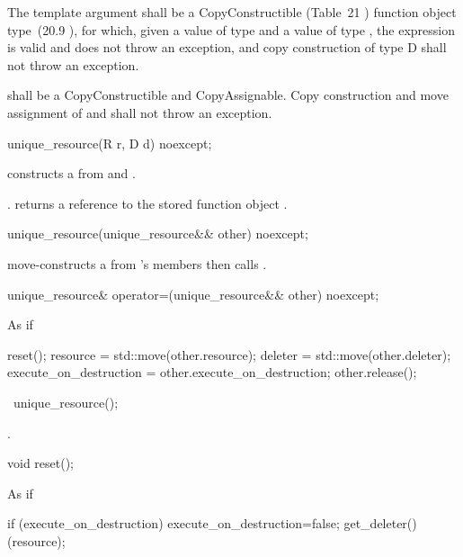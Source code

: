 \documentclass[ebook,11pt,article]{memoir}
\begin{document}
\pnum 
The template argument
 shall be a CopyConstructible (Table~21
) 
function object type~(20.9
), 
for which, given
a value  of type  and a value
 of type , the expression
 is valid and does not throw an exception,
and copy construction of type D shall not throw an exception.

\pnum
{} shall be a CopyConstructible and CopyAssignable.
Copy construction and move assignment of  and  shall not throw an exception.

\begin{itemdecl}
unique_resource(R r, D d) noexcept;
\end{itemdecl}

\begin{itemdescr}
\pnum
\effects constructs a  from  and .

\pnum
\postconditions {}.
 returns a reference to the stored
function object .
\end{itemdescr}

\begin{itemdecl}
unique_resource(unique_resource&& other) noexcept;
\end{itemdecl}

\pnum
\effects move-constructs a  from 's members then calls .

\begin{itemdecl}
unique_resource& operator=(unique_resource&& other) noexcept;
\end{itemdecl}
\pnum
\effects As if
\begin{codeblock}
  reset();
  resource = std::move(other.resource);
  deleter = std::move(other.deleter);
  execute_on_destruction = other.execute_on_destruction;
  other.release();
\end{codeblock}

\begin{itemdecl}
~unique_resource();
\end{itemdecl}

\pnum
\effects {}.

\begin{itemdecl}
void reset();
\end{itemdecl}

\pnum
\effects As if
\begin{codeblock}
  if (execute_on_destruction) {
    execute_on_destruction=false;
    get_deleter()(resource);
  }
\end{codeblock}
\end{document}
